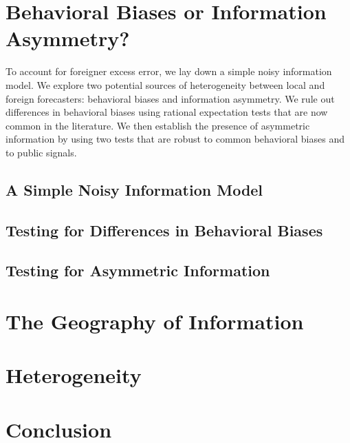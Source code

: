 \documentclass[letterpaper,12pt]{article}
\begin{document}
\section{Behavioral Biases or Information Asymmetry?}\label{sec:model}

To account for foreigner excess error, we lay down a simple noisy information model. We explore two potential sources of heterogeneity between local and foreign forecasters: behavioral biases and information asymmetry. We rule out differences in behavioral biases using rational expectation tests that are now common in the literature. We then establish the presence of asymmetric information by using two tests that are robust to common behavioral biases and to public signals.

\subsection{A Simple Noisy Information Model}


\subsection{Testing for Differences in Behavioral Biases}


\subsection{Testing for Asymmetric Information}


\section{The Geography of Information}\label{sec:geography}


\section{Heterogeneity}\label{sec:heterogeneity}



\section{Conclusion}\label{sec:conclusion}




\end{document}
